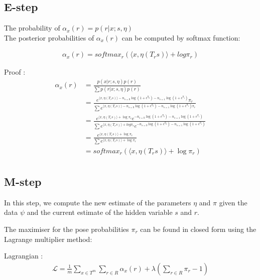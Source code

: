 \documentclass{article}
\newcommand{\Lagr}{\mathcal{L}}
\begin{document}
\subsection*{E-step}
The probability of $\alpha_x(r) = p(r|x;s,\eta)$ \\
The posterior probabilities of $\alpha_x(r)$ can be computed by softmax function:

\begin{align*}
    \alpha_x(r) = softmax_r(\langle x, \eta(T_r s) \rangle + log \pi_r)
\end{align*}

Proof :
\begin{align*}
    \alpha_x(r) &= \frac{p(x|r;s,\eta) p(r)}{\sum p(r|x;s,\eta) p(r)} \\
                &= \frac{e^{\langle x, \eta(T_r s) \rangle - n_{s=0} \log(1 + e^{\eta_0}) - n_{s=1} \log(1 + e^{\eta_1})} \pi_r}{\sum e^{\langle x, \eta(T_r s) \rangle - n_{s=0} \log(1 + e^{\eta_0}) - n_{s=1} \log(1 + e^{\eta_1}) \pi_r}} \\
                &= \frac{e^{\langle x, \eta(T_r s) \rangle + \log \pi_r} e^{- n_{s=0} \log(1 + e^{\eta_0}) - n_{s=1} \log(1 + e^{\eta_1})}}{\sum e^{\langle x, \eta(T_r s) \rangle + log \pi_r} e^{- n_{s=0} \log(1 + e^{\eta_0}) - n_{s=1} \log(1 + e^{\eta_1})}} \\
                &= \frac{e^{\langle x, \eta(T_r s) \rangle + \log \pi_r}}{\sum e^{\langle x, \eta(T_r s) \rangle + \log \pi_r}} \\
                &= softmax_r(\langle x, \eta(T_r s) \rangle + \log \pi_r) \\
\end{align*}

\subsection*{M-step}

In this step, we compute the new estimate of the parameters $\eta$ and $\pi$ given the data $\psi$ and the current estimate of the hidden variable $s$ and $r$.

The maximiser for the pose probabilities $\pi_r$ can be found in closed form using the Lagrange multiplier method:

Lagrangian :
\begin{align*}
    \Lagr = \frac{1}{m} \sum_{x \in T^m} \sum_{r \in R} \alpha_x (r) + \lambda \left( \sum_{r \in R} \pi_r - 1 \right)
\end{align*}
\end{document}
